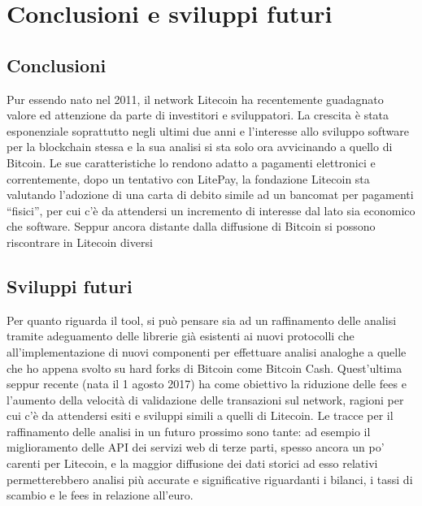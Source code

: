 \chapter{Conclusioni e sviluppi futuri}

\section{Conclusioni}
Pur essendo nato nel 2011, il network Litecoin ha recentemente guadagnato valore ed attenzione da parte di investitori e sviluppatori. La crescita è stata esponenziale soprattutto negli ultimi due anni e l’interesse allo sviluppo software per la blockchain stessa e la sua analisi si sta solo ora avvicinando a quello di Bitcoin. Le sue caratteristiche lo rendono adatto a pagamenti elettronici e correntemente, dopo un tentativo con LitePay, la fondazione Litecoin sta valutando l’adozione di una carta di debito simile ad un bancomat per pagamenti “fisici”, per cui c’è da attendersi un incremento di interesse dal lato sia economico che software.
Seppur ancora distante dalla diffusione di Bitcoin si possono riscontrare in Litecoin diversi


\section{Sviluppi futuri}

Per quanto riguarda il tool, si può pensare sia ad un raffinamento delle analisi tramite adeguamento delle librerie già esistenti ai nuovi protocolli che all'implementazione di nuovi componenti per effettuare analisi analoghe a quelle che ho appena svolto su hard forks di Bitcoin come Bitcoin Cash. Quest’ultima seppur recente (nata il 1 agosto 2017) ha come obiettivo la riduzione delle fees e l’aumento della velocità di validazione delle transazioni sul network, ragioni per cui c’è da attendersi esiti e sviluppi simili a quelli di Litecoin.
Le tracce per il raffinamento delle analisi in un futuro prossimo sono tante: ad esempio il miglioramento delle API dei servizi web di terze parti, spesso ancora un po' carenti per Litecoin, e la maggior diffusione dei dati storici ad esso relativi permetterebbero analisi più accurate e significative riguardanti i bilanci, i tassi di scambio e le fees in relazione all'euro.
